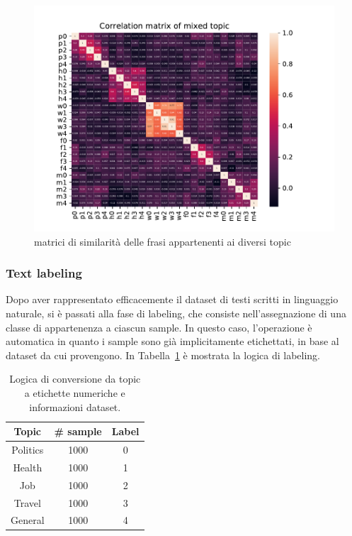 \begin{figure}[h!t]
    \centering
    \includegraphics{Figure/simMatr/mixed.pdf}
    \caption{matrici di similarità delle frasi appartenenti ai diversi topic}
    \label{fig:mtrsim_mix}
\end{figure}
\FloatBarrier

\subsubsection{Text labeling}
\label{sssec:textlabeling}
Dopo aver rappresentato efficacemente il dataset di testi scritti in linguaggio naturale, si è passati alla fase di labeling, che consiste nell'assegnazione di una classe di appartenenza a ciascun sample. In questo caso, l'operazione è automatica in quanto i sample sono già implicitamente etichettati, in base al dataset da cui provengono. In Tabella~\ref{tbl:mtc} è mostrata la logica di labeling.


\begin{table}[h!t]
\centering
\begin{tabular}{c|c|c}
\toprule
\textbf{Topic} & \textbf{\# sample} & \textbf{Label} \\ \midrule
Politics & 1000 & 0 \\ 
Health & 1000& 1 \\ 
Job & 1000& 2 \\ 
Travel & 1000& 3 \\ 
General & 1000& 4 \\ \bottomrule
\end{tabular}
\label{tbl:mtc}
\caption{Logica di conversione da topic a etichette numeriche e informazioni dataset.}
\end{table}


